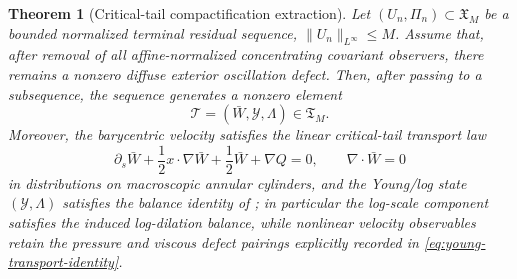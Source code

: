 \documentclass[11pt]{amsart}
\numberwithin{equation}{section}
\theoremstyle{plain}
\newtheorem{theorem}{Theorem}[section]
\theoremstyle{definition}
\theoremstyle{remark}
\newcommand{\Tcrit}{\mathfrak T_M}
\begin{document}
\begin{theorem}[Critical-tail compactification extraction]
\label{thm:critical-tail-compactification-extraction}
Let \((U_n,\Pi_n)\subset\mathfrak X_M\) be a bounded normalized terminal
residual sequence, \(\|U_n\|_{L^\infty}\le M\).  Assume that, after removal of
all affine-normalized concentrating covariant observers, there remains a nonzero
diffuse exterior oscillation defect.  Then, after passing to a subsequence, the
sequence generates a nonzero element
\[
   \mathcal T=(\bar W,\mathcal Y,\Lambda)\in\Tcrit .
\]
Moreover, the barycentric velocity satisfies the linear critical-tail transport
law
\[
   \partial_s\bar W+\frac12 x\cdot\nabla\bar W+\frac12\bar W+\nabla Q=0,
   \qquad
   \nabla\cdot\bar W=0
\]
in distributions on macroscopic annular cylinders, and the Young/log state
\((\mathcal Y,\Lambda)\) satisfies the balance identity of
; in particular the log-scale
component satisfies the induced log-dilation balance, while nonlinear
velocity observables retain the pressure and viscous defect pairings explicitly
recorded in \eqref{eq:young-transport-identity}.
\end{theorem}
\end{document}

